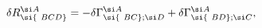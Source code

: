 \begin{equation}
\delta R^{\si A}_{\si{\ BCD}} = -\delta \Gamma^{\si A}_{\si{\ BC};{\si
D}} + \delta \Gamma^{\si A}_{\si{\ BD};{\si C}},
\end{equation}


